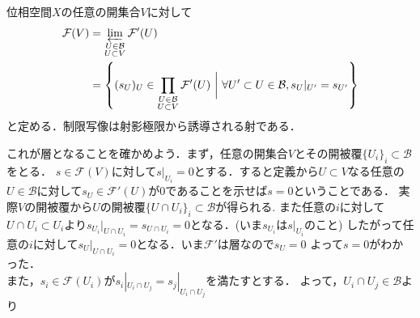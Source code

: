 \documentclass[dvipdfmx,a4paper,11pt]{jsbook}
\begin{document}
{  %


  位相空間$X$の任意の開集合$V$に対して
  \begin{align*}
    \mathcal{F}(V)
     & = \varprojlim_{\substack{U\in \mathcal{B}                  \\ U\subset V}}\mathcal{F}'(U)\\
     & = \left\{(s_{U})_{U} \in \prod_{\substack{U\in \mathcal{B} \\ U \subset V}} \mathcal{F}'(U) \ \biggl|\
    \forall U' \subset U \in \mathcal{B}, s_{U}|_{U'}=s_{U'} \right\}
  \end{align*}
  と定める．制限写像は射影極限から誘導される射である．
  \begin{center}
  \end{center}
  これが層となることを確かめよう．まず，任意の開集合$V$とその開被覆$\{U_{i}\}_{i}\subset \mathcal{B}$をとる．
$s\in \mathcal{F}(V)$に対して$s|_{U_{i}}=0$とする．すると定義から$U\subset V$なる任意の$U\in \mathcal{B}$に対して$s_{U}\in \mathcal{F}'(U)$が$0$であることを示せば$s=0$ということである．
  実際$V$の開被覆から$U$の開被覆$\{U \cap U_{i}\}_{i}\subset \mathcal{B}$が得られる.
  また任意の$i$に対して$U\cap U_{i} \subset U_{i}$より$s_{U_{i}}|_{U\cap U_{i}} = s_{U\cap U_{i}} = 0$となる．(いま$s_{U_{i}}$は$s|_{U_{i}}$のこと)
  したがって任意の$i$に対して$s_{U}|_{U\cap U_{i}} = 0$となる．いま$\mathcal{F}'$は層なので$s_{U}=0$
  よって$s=0$がわかった．\\
  また，$s_{i} \in \mathcal{F}(U_{i})$が$s_{i}|_{U_{i}\cap U_{j}} = s_{j}|_{U_{i} \cap U_{j}}$を満たすとする．
  よって，$U_{i}\cap U_{j} \in \mathcal{B}$より
  }{}
\end{document}
